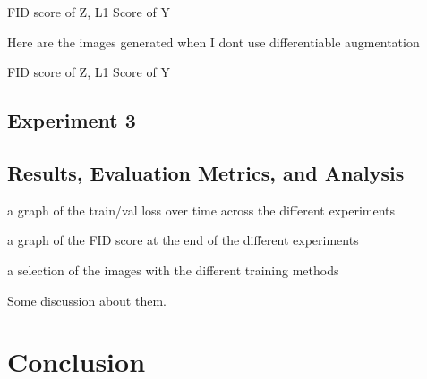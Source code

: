 \documentclass{UoYCSproject}
\begin{document}
FID score of Z, L1 Score of Y

Here are the images generated when I dont use differentiable augmentation

FID score of Z, L1 Score of Y

\section{Experiment 3}



\section{Results, Evaluation Metrics, and Analysis}

a graph of the train/val loss over time across the different experiments


a graph of the FID score at the end of the different experiments


a selection of the images with the different training methods


Some discussion about them.


\newpage{}

\chapter{Conclusion}


\newpage{}

\printbibliography
\end{document}
